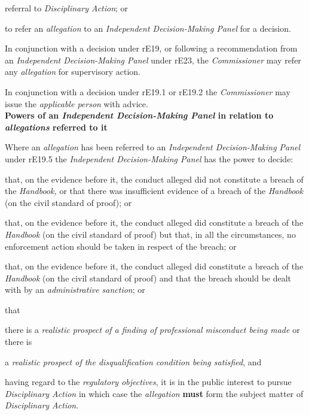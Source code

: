 referral to \emph{Disciplinary Action}; or\item to refer an \emph{allegation} to an \emph{Independent Decision-Making
Panel }for a decision.\ln
{}\par
In conjunction with a decision under rE19, or following a recommendation
from an \emph{Independent Decision-Making Panel} under
rE23, the \emph{Commissioner} may refer any \emph{allegation} for
supervisory action.\\
\par
In conjunction with a decision under rE19.1 or rE19.2
the \emph{Commissioner} may issue the \emph{applicable person} with
advice.\\
\textbf{Powers of an \emph{Independent Decision-Making Panel}\emph{ }in
relation to \emph{allegations} referred to it}\par
{}\par
Where an \emph{allegation} has been referred to an \emph{Independent
Decision-Making Panel }under rE19.5 the \emph{Independent
Decision-Making Panel }has the power to decide:\\\nl \item that, on the evidence before it, the conduct alleged did not
constitute a breach of the \emph{Handbook, }or that there was
insufficient evidence of a breach of the \emph{Handbook} (on the civil
standard of proof); or\item that, on the evidence before it, the conduct alleged did constitute a
breach of the \emph{Handbook} (on the civil standard of proof) but that,
in all the circumstances, no enforcement action should be taken in
respect of the breach; or\item that, on the evidence before it, the conduct alleged did constitute a
breach of the \emph{Handbook} (on the civil standard of proof) and that
the breach should be dealt with by an \emph{administrative sanction};
or\item that
\al \item there is a \emph{realistic prospect of a finding of professional
misconduct being made} or there is \item a \emph{realistic prospect of the
disqualification condition being satisfied}, and\item  having regard to the \emph{regulatory objectives}, it is in the
public interest to pursue \emph{Disciplinary Action}\la
in which case the \emph{allegation}  \textcolor{myred}{\textbf{must}} form the subject matter
of \emph{Disciplinary Action}.\\
